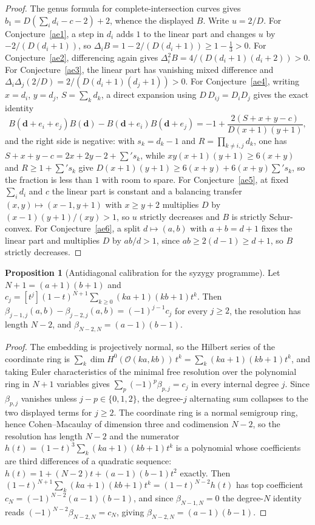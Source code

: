 \documentclass[11pt]{article}
\theoremstyle{definition}
\newtheorem{proposition}{Proposition}
\begin{document}
\begin{proof}
The genus formula for complete-intersection curves gives $b_1=D(\sum_id_i-c-2)+2$, whence the displayed $B$.  Write $u=2/D$.  For Conjecture~\ref{ae1}, a step in $d_i$ adds $1$ to the linear part and changes $u$ by $-2/(D(d_i+1))$, so $\Delta_iB=1-2/(D(d_i+1))\ge1-\tfrac13>0$.  For Conjecture~\ref{ae2}, differencing again gives $\Delta_i^2B=4/(D(d_i+1)(d_i+2))>0$.  For Conjecture~\ref{ae3}, the linear part has vanishing mixed difference and $\Delta_i\Delta_j(2/D)=2/(D(d_i+1)(d_j+1))>0$.  For Conjecture~\ref{ae4}, writing $x=d_i$, $y=d_j$, $S=\sum_kd_k$, a direct expansion using $D\,D_{ij}=D_iD_j$ gives the exact identity
\[
B(\mathbf d+e_i+e_j)B(\mathbf d)-B(\mathbf d+e_i)B(\mathbf d+e_j)=-1+\frac{2(S+x+y-c)}{D(x+1)(y+1)},
\]
and the right side is negative: with $s_k=d_k-1$ and $R=\prod_{k\ne i,j}d_k$, one has $S+x+y-c=2x+2y-2+\sum's_k$, while $xy(x+1)(y+1)\ge6(x+y)$ and $R\ge1+\sum's_k$ give $D(x+1)(y+1)\ge6(x+y)+6(x+y)\sum's_k$, so the fraction is less than $1$ with room to spare.  For Conjecture~\ref{ae5}, at fixed $\sum_id_i$ and $c$ the linear part is constant and a balancing transfer $(x,y)\mapsto(x-1,y+1)$ with $x\ge y+2$ multiplies $D$ by $(x-1)(y+1)/(xy)>1$, so $u$ strictly decreases and $B$ is strictly Schur-convex.  For Conjecture~\ref{ae6}, a split $d\mapsto(a,b)$ with $a+b=d+1$ fixes the linear part and multiplies $D$ by $ab/d>1$, since $ab\ge2(d-1)\ge d+1$, so $B$ strictly decreases.
\end{proof}

\begin{proposition}[Antidiagonal calibration for the syzygy programme]\label{ae:strand}
Let $N+1=(a+1)(b+1)$ and $c_j=[t^j](1-t)^{N+1}\sum_{k\ge0}(ka+1)(kb+1)t^k$.  Then $\beta_{j-1,j}(a,b)-\beta_{j-2,j}(a,b)=(-1)^{j-1}c_j$ for every $j\ge2$, the resolution has length $N-2$, and $\beta_{N-2,N}=(a-1)(b-1)$.
\end{proposition}

\begin{proof}
The embedding is projectively normal, so the Hilbert series of the coordinate ring is $\sum_k\dim H^0(\mathcal O(ka,kb))\,t^k=\sum_k(ka+1)(kb+1)t^k$, and taking Euler characteristics of the minimal free resolution over the polynomial ring in $N+1$ variables gives $\sum_p(-1)^p\beta_{p,j}=c_j$ in every internal degree $j$.  Since $\beta_{p,j}$ vanishes unless $j-p\in\{0,1,2\}$, the degree-$j$ alternating sum collapses to the two displayed terms for $j\ge2$.  The coordinate ring is a normal semigroup ring, hence Cohen--Macaulay of dimension three and codimension $N-2$, so the resolution has length $N-2$ and the numerator $h(t)=(1-t)^3\sum_k(ka+1)(kb+1)t^k$ is a polynomial whose coefficients are third differences of a quadratic sequence: $h(t)=1+(N-2)t+(a-1)(b-1)t^2$ exactly.  Then $(1-t)^{N+1}\sum_k(ka+1)(kb+1)t^k=(1-t)^{N-2}h(t)$ has top coefficient $c_N=(-1)^{N-2}(a-1)(b-1)$, and since $\beta_{N-1,N}=0$ the degree-$N$ identity reads $(-1)^{N-2}\beta_{N-2,N}=c_N$, giving $\beta_{N-2,N}=(a-1)(b-1)$.
\end{proof}
\end{document}
